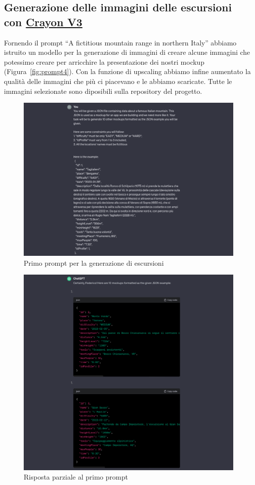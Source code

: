 \subsection{Generazione delle immagini delle escursioni con \href{https://www.craiyon.com}{Crayon V3}}
Fornendo il prompt ``A fictitious mountain range in northern Italy'' abbiamo istruito un modello per la generazione di immagini di creare alcune immagini che potessimo creare per arricchire la presentazione dei nostri mockup (Figura~\ref*{fig:prompt4}).
Con la funzione di upscaling abbiamo infine aumentato la qualità delle immagini che più ci piacevano e le abbiamo scaricate. Tutte le immagini selezionate sono diposibili sulla repository del progetto.
\newpage
\begin{figure}[ht]
  \includegraphics[width=\linewidth]{images/prompt1.png}
  \caption{Primo prompt per la generazione di escursioni}\label{fig:prompt1}
\end{figure}
\begin{figure}[ht]
  \includegraphics[width=\linewidth]{images/answer1.png}
  \caption{Risposta parziale al primo prompt}\label{fig:answ1}
\end{figure}
